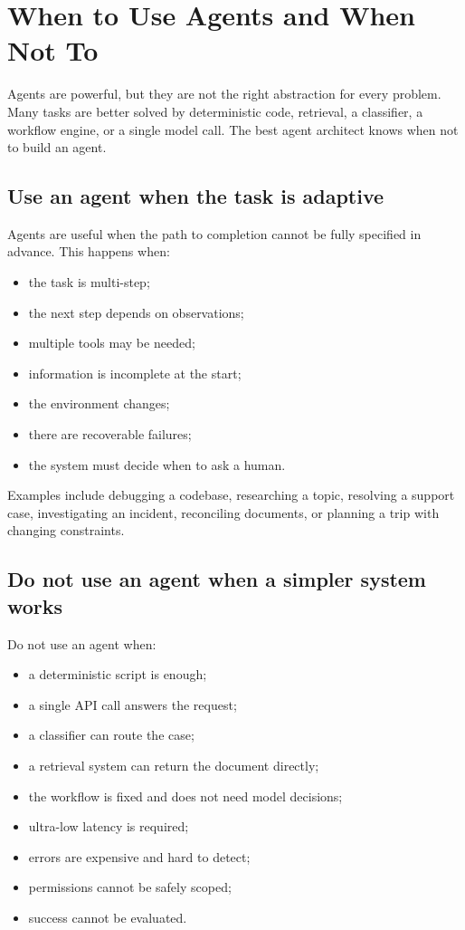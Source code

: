 \chapter{When to Use Agents and When Not To}

Agents are powerful, but they are not the right abstraction for every problem. Many tasks are better solved by deterministic code, retrieval, a classifier, a workflow engine, or a single model call. The best agent architect knows when not to build an agent.

\section{Use an agent when the task is adaptive}

Agents are useful when the path to completion cannot be fully specified in advance. This happens when:

\begin{itemize}[leftmargin=*]
  \item the task is multi-step;
  \item the next step depends on observations;
  \item multiple tools may be needed;
  \item information is incomplete at the start;
  \item the environment changes;
  \item there are recoverable failures;
  \item the system must decide when to ask a human.
\end{itemize}

Examples include debugging a codebase, researching a topic, resolving a support case, investigating an incident, reconciling documents, or planning a trip with changing constraints.

\section{Do not use an agent when a simpler system works}

Do not use an agent when:

\begin{itemize}[leftmargin=*]
  \item a deterministic script is enough;
  \item a single API call answers the request;
  \item a classifier can route the case;
  \item a retrieval system can return the document directly;
  \item the workflow is fixed and does not need model decisions;
  \item ultra-low latency is required;
  \item errors are expensive and hard to detect;
  \item permissions cannot be safely scoped;
  \item success cannot be evaluated.
\end{itemize}

